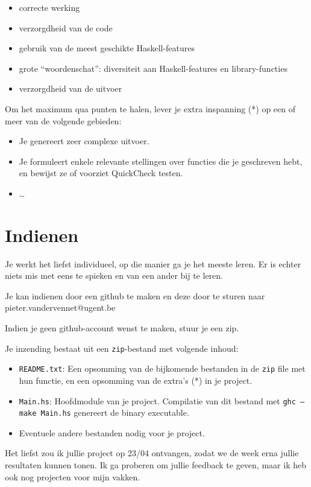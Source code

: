 \documentclass{article}
\begin{document}
\begin{itemize}
\item correcte werking
\item verzorgdheid van de code
\item gebruik van de meest geschikte Haskell-features
\item grote ``woordenschat'': diversiteit aan Haskell-features en library-functies
\item verzorgdheid van de uitvoer
\end{itemize}

Om het maximum qua punten te halen, lever je extra inspanning (*) op een of meer
van de volgende gebieden:
\begin{itemize}
\item Je genereert zeer complexe uitvoer.
\item Je formuleert enkele relevante stellingen over functies die
      je geschreven hebt, en bewijst ze of voorziet QuickCheck testen.
\item \ldots
\end{itemize}

\section{Indienen}

Je werkt het liefst individueel, op die manier ga je het meeste leren. Er is echter niets mis met eens te spieken en van een ander bij te leren.

Je kan indienen door een github te maken en deze door te sturen naar pieter.vandervennet@ugent.be

Indien je geen github-account wenst te maken, stuur je een zip.

Je inzending bestaat uit een \texttt{zip}-bestand met volgende inhoud:
\begin{itemize}
\item \texttt{README.txt}: Een opsomming van de bijkomende bestanden in de \texttt{zip}
      file met hun functie, en een opsomming van de extra's (*) in je project.
\item \texttt{Main.hs}: Hoofdmodule van je project. Compilatie van dit bestand
      met \texttt{ghc --make Main.hs} genereert de binary executable.
\item Eventuele andere bestanden nodig voor je project.
\end{itemize}

Het liefst zou ik jullie project op 23/04 ontvangen, zodat we de week erna jullie resultaten kunnen tonen. Ik ga proberen om jullie feedback te geven, maar ik heb ook nog projecten voor mijn vakken.
\end{document}
